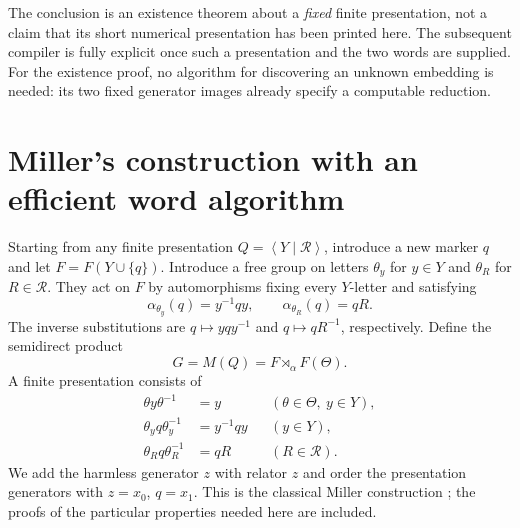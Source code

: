 \documentclass[11pt,letterpaper]{article}
\numberwithin{equation}{section}
\theoremstyle{definition}
\theoremstyle{remark}
\newcommand{\srcmark}[1]{\par\noindent{\small\itshape [source~#1]}\par}
\newcommand{\pair}[1]{\left\langle #1\right\rangle}
\begin{document}
The conclusion is an existence theorem about a \emph{fixed} finite
presentation, not a claim that its short numerical presentation has been
printed here. The subsequent compiler is fully explicit once such a
presentation and the two words are supplied. For the existence proof,
no algorithm for discovering an unknown embedding is needed: its two
fixed generator images already specify a computable reduction.

\section{Miller's construction with an efficient word algorithm}
\label{pqc:rr:sec:miller}
\srcmark{11}

Starting from any finite presentation $Q=\pair{Y\mid\mathcal R}$, introduce
a new marker $q$ and let $F=F(Y\cup\{q\})$. Introduce a free group on
letters $\theta_y$ for $y\in Y$ and $\theta_R$ for $R\in\mathcal R$.
They act on $F$ by automorphisms fixing every $Y$-letter and satisfying
\begin{equation}\label{pqc:rr:eq:milleraction}
 \alpha_{\theta_y}(q)=y^{-1}qy,\qquad
 \alpha_{\theta_R}(q)=qR.
\end{equation}
The inverse substitutions are $q\mapsto yqy^{-1}$ and
$q\mapsto qR^{-1}$, respectively. Define the semidirect product
\[
 G=M(Q)=F\rtimes_\alpha F(\Theta).
\]
A finite presentation consists of
\begin{align}
 \theta y\theta^{-1}&=y
       &&(\theta\in\Theta,\ y\in Y),\label{pqc:rr:eq:millerrels1}\\
 \theta_yq\theta_y^{-1}&=y^{-1}qy
       &&(y\in Y),\label{pqc:rr:eq:millerrels2}\\
 \theta_Rq\theta_R^{-1}&=qR
       &&(R\in\mathcal R).\label{pqc:rr:eq:millerrels3}
\end{align}
We add the harmless generator $z$ with relator $z$ and order the
presentation generators with $z=x_0$, $q=x_1$. This is the classical
Miller construction \cite{b62s11-Miller,b62s11-Gillis}; the proofs of the particular
properties needed here are included.
\end{document}
